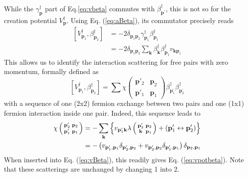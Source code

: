 \documentclass[aps,prb,superscriptaddress,showpacs,reprint,lengthcheck]{revtex4-1}
\newcommand{\vk}{\ensuremath{\mathbf{k}}}
\newcommand{\vp}{\ensuremath{\mathbf{p}}}
\begin{document}
While the $\gamma^{\dagger}_\vp$ part of Eq.\eqref{eq:vbeta} 
commutes with $%
\beta^{\dagger}_{\vp ^\prime}$, 
this is not so for the creation potential $%
V^{\dagger}_\vp$. Using Eq. (\ref{eq:aBeta}), its commutator precisely reads 
\begin{equation}\begin{split}  \label{eq:vpotbeta}
\left[V^{\dagger}_{\mathbf{p} _1},\beta^{\dagger}_{\mathbf{p} _2}\right] 
&=-2\delta_{\mathbf{p} _1\mathbf{p} _2}\gamma^{\dagger}_{\mathbf{p}
_1}\beta^{\dagger}_{\mathbf{p} _1}\\
&=-2\delta_{\mathbf{p} _1\mathbf{p} _2}\sum_\mathbf{k}\beta^{\dagger}_{\mathbf{k}}\beta^{\dagger}_{\mathbf{p} _1}v_{\mathbf{k}\mathbf{p} _1}
\end{split}\end{equation}
This allows us to identify the interaction scattering for free pairs with zero momentum,
formally defined as \cite{CobosonPhysicsReports}
\begin{equation}  \label{eq:vBeta}
\left[V^{\dagger}_{\mathbf{p} _1},\beta^{\dagger}_{\mathbf{p} _2}\right] 
=\sum\chi\left(\begin{smallmatrix}\vp'_2&\vp_2\\\vp'_1&\vp_1\end{smallmatrix}%
\right)  \beta^{\dagger}_{\mathbf{p} ^{\prime}_1}\beta^{\dagger}_{\mathbf{p}
^{\prime}_2}
\end{equation}
with a sequence of one (2x2) fermion exchange between two pairs and one (1x1) fermion interaction inside one pair. Indeed, this sequence leads to
\begin{equation}  \label{eq:interactSc}
\begin{split}
\chi\left(\begin{smallmatrix}\vp'_2&\vp_2\\\vp'_1&\vp_1\end{smallmatrix}%
\right)  &=-\sum_\vk\left\{v_{\mathbf{p} ^{\prime}_1\mathbf{k} }\lambda\left(%
\begin{smallmatrix}\vp'_2&\vp_2\\\vk&\vp_1\end{smallmatrix}\right)  +\left(%
\mathbf{p} ^{\prime}_1\leftrightarrow\mathbf{p} ^{\prime}_2\right) \right\} 
\\
&=-\left(v_{\mathbf{p} ^{\prime}_1,\mathbf{p} _1}\delta_{\mathbf{p}
^{\prime}_2,\mathbf{p} _2}+v_{\mathbf{p} ^{\prime}_2,\mathbf{p} _2}\delta_{%
\mathbf{p} ^{\prime}_1,\mathbf{p} _1}\right) \delta_{\mathbf{p} _2,\mathbf{p}
_1}
\end{split}%
\end{equation}
When inserted into Eq. (\ref{eq:vBeta}), this readily gives Eq. (\ref{eq:vpotbeta}). Note that these scatterings are unchanged by changing 1 into 2. 
\end{document}
